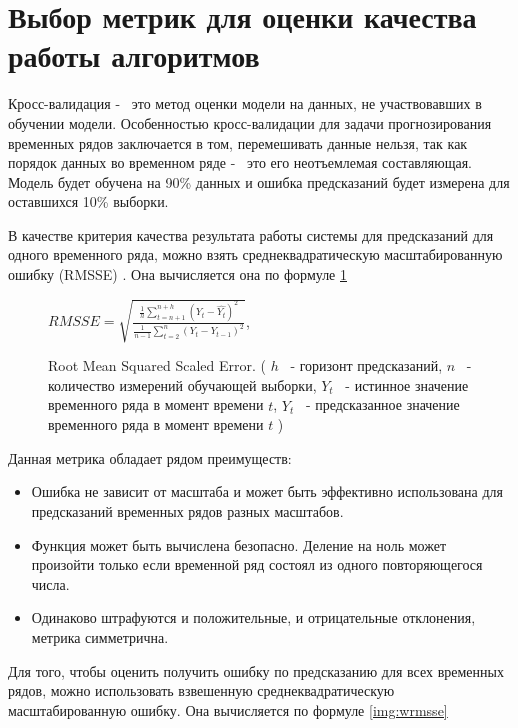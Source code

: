 \section{Выбор метрик для оценки качества работы алгоритмов}

Кросс-валидация -~ это метод оценки модели на данных, не участвовавших
в обучении модели. Особенностью кросс-валидации для задачи прогнозирования
временных рядов заключается в том, перемешивать данные нельзя,
так как порядок данных во временном ряде -~ это его неотъемлемая составляющая.
Модель будет обучена на 90\% данных и ошибка предсказаний будет измерена
для оставшихся 10\% выборки.

В качестве критерия качества результата работы системы для предсказаний
для одного временного ряда, можно взять среднеквадратическую
масштабированную ошибку (RMSSE) \cite{hyndman2006another}.
Она вычисляется она по формуле \ref{img:rmsse}

\def\figurename{Формула}
\begin{figure}[t]
	\centering
	$ RMSSE = \sqrt{ \frac{ \frac{1}{h} \sum_{t=n+1}^{n+h}(Y_t - \hat{Y_t})^2  }{ \frac{1}{n-1} \sum_{t=2}^{n} (Y_t - Y_{t-1})^2 } } $,

	\caption{Root Mean Squared Scaled Error.
	(
		$ h $ ~- горизонт предсказаний,
		$ n $ ~- количество измерений обучающей выборки,
		$ Y_t $ ~- истинное значение временного ряда в момент времени $ t $,
		$ \hat{Y_t} $ ~- предсказанное значение временного ряда в момент времени $ t $
	)}
	\label{img:rmsse}
\end{figure}
\def\figurename{Рис.}

Данная метрика обладает рядом преимуществ:

\begin{itemize}
	\item Ошибка не зависит от масштаба и может быть эффективно использована для предсказаний временных рядов разных масштабов.
	\item Функция может быть вычислена безопасно. Деление на ноль может произойти только если временной ряд состоял из одного повторяющегося числа.
	\item Одинаково штрафуются и положительные, и отрицательные отклонения, метрика симметрична.
\end{itemize}

Для того, чтобы оценить получить ошибку по предсказанию для всех временных рядов,
можно использовать взвешенную среднеквадратическую масштабированную ошибку.
Она вычисляется по формуле \ref{img:wrmsse}

